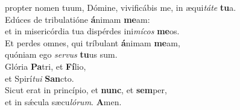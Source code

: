 \evenverse propter nomen tuum, Dómine, vivificábis me, in æqui\textit{tá}\textit{te} \textbf{tu}a.\\
\oddverse Edúces de tribulatióne \textbf{á}nimam \textbf{me}am:~\*\\
\oddverse et in misericórdia tua dispérdes ini\textit{mí}\textit{cos} \textbf{me}os.\\
\evenverse Et perdes omnes, qui tríbulant \textbf{á}nimam \textbf{me}am,~\*\\
\evenverse quóniam ego \textit{ser}\textit{vus} \textbf{tu}us sum.\\
\oddverse Glória \textbf{Pa}tri, et \textbf{Fí}lio,~\*\\
\oddverse et Spirí\textit{tu}\textit{i} \textbf{San}cto.\\
\evenverse Sicut erat in princípio, et \textbf{nunc}, et \textbf{sem}per,~\*\\
\evenverse et in sǽcula sæcu\textit{ló}\textit{rum}. \textbf{A}men.\\
